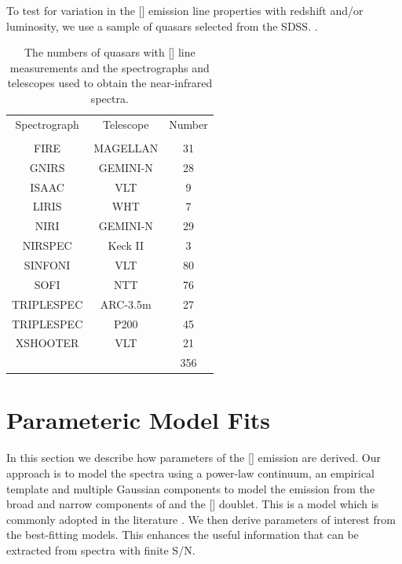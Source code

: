 To test for variation in the [] emission line properties with redshift and/or luminosity, we use a sample of quasars selected from the \ac{SDSS}. 
. 


\begin{table}
  \centering
  \small 
  \caption{The numbers of quasars with [] line measurements and the spectrographs and telescopes used to obtain the near-infrared spectra.}
  \label{tab:specnums_ch4}
    \begin{tabular}{ccc} 
    \hline
    Spectrograph & Telescope & Number \\
                 &           & \\
    \hline
    FIRE         & MAGELLAN  & 31 \\
    GNIRS        & GEMINI-N  & 28 \\
    ISAAC        & VLT       & 9 \\
    LIRIS        & WHT       & 7 \\
    NIRI         & GEMINI-N  & 29 \\
    NIRSPEC      & Keck II   & 3 \\
    SINFONI      & VLT       & 80 \\
    SOFI         & NTT       & 76 \\
    TRIPLESPEC   & ARC-3.5m  & 27 \\
    TRIPLESPEC   & P200      & 45 \\
    XSHOOTER     & VLT       & 21 \\
    \hline
    & & 356 \\
    \hline
    \end{tabular}
\end{table} 

\section{Parameteric Model Fits}

In this section we describe how parameters of the [] emission are derived. 
Our approach is to model the spectra using a power-law continuum, an empirical  template and multiple Gaussian components to model the emission from the broad and narrow components of \hb and the [] doublet.
This is a model which is commonly adopted in the literature \citep[e.g.][]{shen11}. 
We then derive parameters of interest from the best-fitting models. 
This enhances the useful information that can be extracted from spectra with finite \ac{S/N}. 

